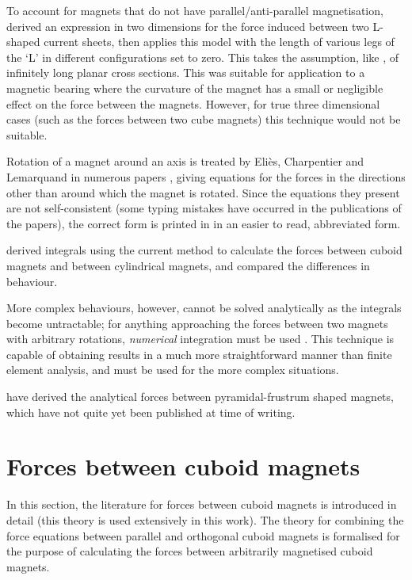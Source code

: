 \documentclass[11pt,a4paper]{memoir}
\begin{document}
To account for magnets that do not have parallel/anti-parallel
magnetisation, \textcite{chen2002,chen2003} derived an expression in two
dimensions for the force induced between two L-shaped current
sheets, then applies this model with the length
of various legs of the `L' in different configurations set to zero. This
takes the assumption, like \textcite{yonnet1981}, of infinitely long
planar cross sections.
This was suitable for application to a magnetic bearing where
the curvature of the magnet has a small or negligible effect on the
force between the magnets. However, for true three dimensional cases
(such as the forces between two cube magnets) this technique would not
be suitable.

Rotation of a magnet around an axis is treated by Eliès, Charpentier and
Lemarquand in numerous papers
\cite{elies1998,charpentier1999-ietm-mar,charpentier1999-ietm-sep,elies1999a}, giving equations
for the forces in the directions other than around which the magnet is
rotated. Since the equations they present are not self-consistent (some typing
mistakes have occurred in the publications of the papers), the correct form is
printed in  in an easier to read, abbreviated form.

\textcite{nagaraj1988} derived integrals using the current method
 to calculate the forces between cuboid magnets and
between cylindrical magnets, and compared the differences in
behaviour.

More complex behaviours, however, cannot be solved analytically as the
integrals become untractable; for anything approaching the forces
between two magnets with arbitrary rotations, \emph{numerical}
integration must be used \cite{elies1999a}. This technique is capable
of obtaining results in a much more straightforward manner than finite
element analysis, and must be used for the more complex situations.

\textcite{janssen2009-ietm} have derived the analytical forces between pyramidal-frustrum shaped magnets, which have not quite yet been published at time of writing. 



\section{Forces between cuboid magnets}

In this section, the literature for forces between cuboid magnets is introduced in detail (this theory is used extensively in this work).
The theory for combining the force equations between parallel and orthogonal cuboid magnets is formalised for the purpose of calculating the forces between arbitrarily magnetised cuboid magnets.
\end{document}
